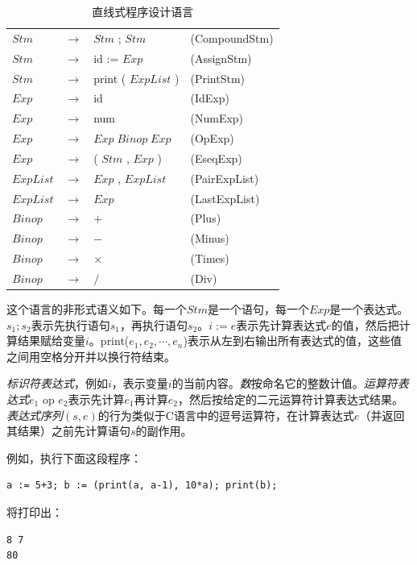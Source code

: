 \documentclass[cn,11pt,chinese]{elegantbook}
\begin{document}
\renewcommand\tablename{文法}
\begin{table}[htbp]
  \centering
  \begin{tabular}{llll}
  $Stm$ & $\rightarrow$ & $Stm$ ; $Stm$ & (CompoundStm) \\
  $Stm$ & $\rightarrow$ & id := $Exp$ & (AssignStm) \\
  $Stm$ & $\rightarrow$ & print ( $ExpList$ ) & (PrintStm) \\
  $Exp$ & $\rightarrow$ & id & (IdExp) \\
  $Exp$ & $\rightarrow$ & num & (NumExp) \\
  $Exp$ & $\rightarrow$ & $Exp \; Binop \; Exp$ & (OpExp) \\
  $Exp$ & $\rightarrow$ & ( $Stm$ , $Exp$ ) & (EseqExp) \\
  $ExpList$ & $\rightarrow$ & $Exp$ , $ExpList$ & (PairExpList) \\
  $ExpList$ & $\rightarrow$ & $Exp$ & (LastExpList) \\
  $Binop$ & $\rightarrow$ & $+$ & (Plus) \\
  $Binop$ & $\rightarrow$ & $-$ & (Minus) \\
  $Binop$ & $\rightarrow$ & $\times$ & (Times) \\
  $Binop$ & $\rightarrow$ & $/$ & (Div) \\
  \end{tabular}
  \caption{直线式程序设计语言}\label{grammar:1}
\end{table}
\renewcommand\tablename{表}

这个语言的非形式语义如下。每一个$Stm$是一个语句，每一个$Exp$是一个表达式。$s_1;s_2$表示先执行语句$s_1$，再执行语句$s_2$。$i := e$表示先计算表达式$e$的值，然后把计算结果赋给变量$i$。print($e_1,e_2,\cdots,e_n$)表示从左到右输出所有表达式的值，这些值之间用空格分开并以换行符结束。

\textit{标识符表达式}，例如$i$，表示变量$i$的当前内容。\textit{数}按命名它的整数计值。\textit{运算符表达式}$e_1$ op $e_2$表示先计算$e_1$再计算$e_2$，然后按给定的二元运算符计算表达式结果。\textit{表达式序列}$(s,e)$的行为类似于C语言中的逗号运算符，在计算表达式$e$（并返回其结果）之前先计算语句$s$的副作用。

例如，执行下面这段程序：

\begin{verbatim}
a := 5+3; b := (print(a, a-1), 10*a); print(b);  
\end{verbatim}

将打印出：

\begin{verbatim}
8 7
80
\end{verbatim}
\end{document}
